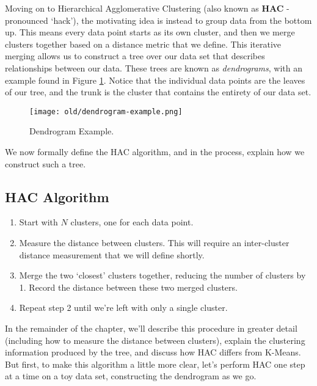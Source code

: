 Moving on to Hierarchical Agglomerative Clustering (also known as \textbf{HAC} - pronounced `hack'), the motivating idea is instead to group data from the bottom up. This means every data point starts as its own cluster, and then we merge clusters together based on a distance metric that we define. This iterative merging allows us to construct a tree over our data set that describes relationships between our data. These trees are known as \textit{dendrograms}, with an example found in Figure \ref{fig:dendrogram-example}. Notice that the individual data points are the leaves of our tree, and the trunk is the cluster that contains the entirety of our data set.

\begin{figure}
    \centering
    \texttt{[image: old/dendrogram-example.png]}
    \caption{Dendrogram Example.}
    \label{fig:dendrogram-example}
\end{figure}

We now formally define the HAC algorithm, and in the process, explain how we construct such a tree.

\subsection{HAC Algorithm}
\begin{enumerate}
    \item Start with $N$ clusters, one for each data point.
    \item Measure the distance between clusters. This will require an inter-cluster distance measurement that we will define shortly.
    \item Merge the two `closest' clusters together, reducing the number of clusters by 1. Record the distance between these two merged clusters.
    \item Repeat step 2 until we're left with only a single cluster.
\end{enumerate}

In the remainder of the chapter, we'll describe this procedure in greater detail (including how to measure the distance between clusters), explain the clustering information produced by the tree, and discuss how HAC differs from K-Means. But first, to make this algorithm a little more clear, let's perform HAC one step at a time on a toy data set, constructing the dendrogram as we go.

